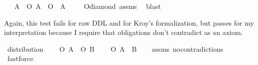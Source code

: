 \begin{isabellebody}
\ \ \ {\isachardoublequoteopen}{\isasymforall}A{\isachardot}\ {\isasymTurnstile}{\isacharparenleft}\ \isactrlbold {\isasymnot}{\isacharparenleft}O\ {\isacharbraceleft}A{\isacharbraceright}\ \isactrlbold {\isasymand}\ O\ {\isacharbraceleft}\isactrlbold {\isasymnot}\ A{\isacharbraceright}{\isacharparenright}{\isacharparenright}\ {\isachardoublequoteclose}\isanewline
%
\isadelimproof
\ \ %
\endisadelimproof
%
\isatagproof
{}\isamarkupfalse%
\ O{\isacharunderscore}diamond\ assms\ \isamarkupfalse%
\ blast\isanewline
%
%
\endisatagproof
{\isafoldproof}%
%
\isadelimproof
%
\endisadelimproof
%
\begin{isamarkuptext}%
Again, this test fails for raw DDL and for Kroy's formalization, but
passes for my interpretation because I require that obligations don't contradict as an axiom.%
\end{isamarkuptext}\isamarkuptrue%
\isamarkupfalse%
\ distribution{\isacharcolon}\isanewline
\ \ \ {\isachardoublequoteopen}{\isasymTurnstile}\ {\isacharparenleft}O\ {\isacharbraceleft}A{\isacharbraceright}\ \isactrlbold {\isasymand}\ O\ {\isacharbraceleft}B{\isacharbraceright}{\isacharparenright}{\isachardoublequoteclose}\isanewline
\ \ \ {\isachardoublequoteopen}{\isasymTurnstile}\ O\ {\isacharbraceleft}A\ \isactrlbold {\isasymand}\ B{\isacharbraceright}{\isachardoublequoteclose}\isanewline
%
\isadelimproof
\ \ %
\endisadelimproof
%
\isatagproof
{}\isamarkupfalse%
\ assms\ no{\isacharunderscore}contradictions\ \isamarkupfalse%
\ fastforce\isanewline
%
%
\endisatagproof
{\isafoldproof}%
%
\isadelimproof
%
\endisadelimproof
%
\begin{isamarkuptext}%
\medskip 


\end{isamarkuptext}
\end{isabellebody}
